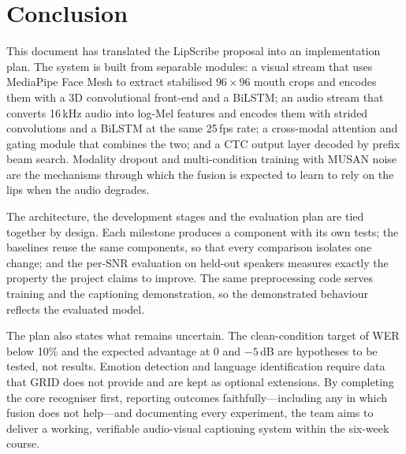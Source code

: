 \section{Conclusion}
\label{sec:conclusion}

This document has translated the LipScribe proposal into an implementation plan.
The system is built from separable modules: a visual stream that uses MediaPipe
Face Mesh to extract stabilised $96\times96$ mouth crops and encodes them with a 3D
convolutional front-end and a BiLSTM; an audio stream that converts 16\,kHz audio
into log-Mel features and encodes them with strided convolutions and a BiLSTM at
the same 25\,fps rate; a cross-modal attention and gating module that combines
the two; and a CTC output layer decoded by prefix beam search. Modality dropout
and multi-condition training with MUSAN noise are the mechanisms through which the
fusion is expected to learn to rely on the lips when the audio degrades.

The architecture, the development stages and the evaluation plan are tied
together by design. Each milestone produces a component with its own tests; the
baselines reuse the same components, so that every comparison isolates one
change; and the per-SNR evaluation on held-out speakers measures exactly the
property the project claims to improve. The same preprocessing code serves
training and the captioning demonstration, so the demonstrated behaviour reflects
the evaluated model.

The plan also states what remains uncertain. The clean-condition target of WER
below 10\% and the expected advantage at 0 and $-5$\,dB are hypotheses to be
tested, not results. Emotion detection and language identification require data
that GRID does not provide and are kept as optional extensions. By completing the
core recogniser first, reporting outcomes faithfully---including any in which
fusion does not help---and documenting every experiment, the team aims to deliver
a working, verifiable audio-visual captioning system within the six-week course.
